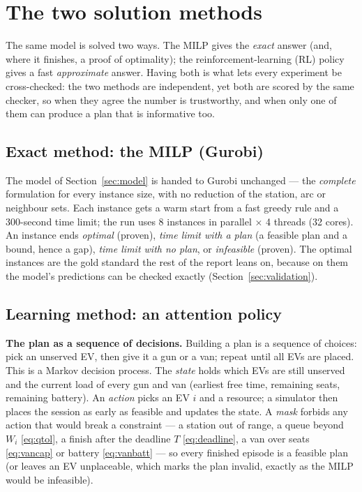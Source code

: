 \section{The two solution methods}
\label{sec:methods}

The same model is solved two ways. The MILP gives the \emph{exact} answer (and, where it finishes, a proof of
optimality); the reinforcement-learning (RL) policy gives a fast \emph{approximate} answer. Having both is what
lets every experiment be cross-checked: the two methods are independent, yet both are scored by the same checker,
so when they agree the number is trustworthy, and when only one of them can produce a plan that is informative too.

\subsection{Exact method: the MILP (Gurobi)}
The model of Section~\ref{sec:model} is handed to Gurobi unchanged --- the \emph{complete} formulation for every
instance size, with no reduction of the station, arc or neighbour sets. Each instance gets a warm start from a
fast greedy rule and a 300-second time limit; the run uses 8 instances in parallel $\times$ 4 threads (32 cores).
An instance ends \emph{optimal} (proven), \emph{time limit with a plan} (a feasible plan and a bound, hence a gap),
\emph{time limit with no plan}, or \emph{infeasible} (proven). The optimal instances are the gold standard the
rest of the report leans on, because on them the model's predictions can be checked exactly
(Section~\ref{sec:validation}).

\subsection{Learning method: an attention policy}
\textbf{The plan as a sequence of decisions.} Building a plan is a sequence of choices: pick an unserved EV, then
give it a gun or a van; repeat until all EVs are placed. This is a Markov decision process. The \emph{state}
holds which EVs are still unserved and the current load of every gun and van (earliest free time, remaining seats,
remaining battery). An \emph{action} picks an EV $i$ and a resource; a simulator then places the session as early
as feasible and updates the state. A \emph{mask} forbids any action that would break a constraint --- a station
out of range, a queue beyond $W_i$ \eqref{eq:qtol}, a finish after the deadline $T$ \eqref{eq:deadline}, a van
over seats \eqref{eq:vancap} or battery \eqref{eq:vanbatt} --- so every finished episode is a feasible plan (or
leaves an EV unplaceable, which marks the plan invalid, exactly as the MILP would be infeasible).


